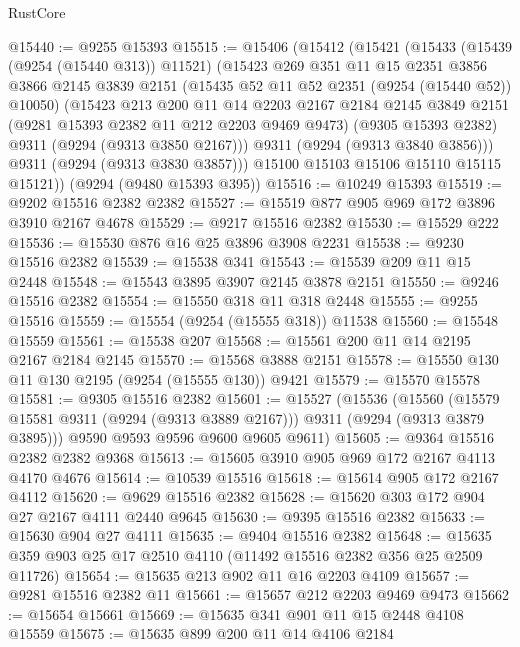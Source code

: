 \begin{lexlean}{RustCore}
\begin{coremodule}
@15440 := @9255 @15393
@15515 := @15406
    (@15412
      (@15421
        (@15433
          (@15439 (@9254 (@15440 @313)) @11521)
          (@15423
            @269
            @351
            @11
            @15
            @2351
            @3856
            @3866
            @2145
            @3839
            @2151
            (@15435 @52 @11 @52 @2351 (@9254 (@15440 @52)) @10050)
            (@15423
              @213
              @200
              @11
              @14
              @2203
              @2167
              @2184
              @2145
              @3849
              @2151
              (@9281 @15393 @2382 @11 @212 @2203 @9469 @9473)
              (@9305 @15393 @2382)
              @9311
              (@9294 (@9313 @3850 @2167)))
            @9311
            (@9294 (@9313 @3840 @3856)))
          @9311
          (@9294 (@9313 @3830 @3857)))
        @15100
        @15103
        @15106
        @15110
        @15115
        @15121))
    (@9294 (@9480 @15393 @395))
@15516 := @10249 @15393
@15519 := @9202 @15516 @2382 @2382
@15527 := @15519 @877 @905 @969 @172 @3896 @3910 @2167 @4678
@15529 := @9217 @15516 @2382
@15530 := @15529 @222
@15536 := @15530 @876 @16 @25 @3896 @3908 @2231
@15538 := @9230 @15516 @2382
@15539 := @15538 @341
@15543 := @15539 @209 @11 @15 @2448
@15548 := @15543 @3895 @3907 @2145 @3878 @2151
@15550 := @9246 @15516 @2382
@15554 := @15550 @318 @11 @318 @2448
@15555 := @9255 @15516
@15559 := @15554 (@9254 (@15555 @318)) @11538
@15560 := @15548 @15559
@15561 := @15538 @207
@15568 := @15561 @200 @11 @14 @2195 @2167 @2184 @2145
@15570 := @15568 @3888 @2151
@15578 := @15550 @130 @11 @130 @2195 (@9254 (@15555 @130)) @9421
@15579 := @15570 @15578
@15581 := @9305 @15516 @2382
@15601 := @15527
    (@15536
      (@15560 (@15579 @15581 @9311 (@9294 (@9313 @3889 @2167))) @9311 (@9294 (@9313 @3879 @3895)))
      @9590
      @9593
      @9596
      @9600
      @9605
      @9611)
@15605 := @9364 @15516 @2382 @2382 @9368
@15613 := @15605 @3910 @905 @969 @172 @2167 @4113 @4170 @4676
@15614 := @10539 @15516
@15618 := @15614 @905 @172 @2167 @4112
@15620 := @9629 @15516 @2382
@15628 := @15620 @303 @172 @904 @27 @2167 @4111 @2440 @9645
@15630 := @9395 @15516 @2382
@15633 := @15630 @904 @27 @4111
@15635 := @9404 @15516 @2382
@15648 := @15635 @359 @903 @25 @17 @2510 @4110 (@11492 @15516 @2382 @356 @25 @2509 @11726)
@15654 := @15635 @213 @902 @11 @16 @2203 @4109
@15657 := @9281 @15516 @2382 @11
@15661 := @15657 @212 @2203 @9469 @9473
@15662 := @15654 @15661
@15669 := @15635 @341 @901 @11 @15 @2448 @4108 @15559
@15675 := @15635 @899 @200 @11 @14 @4106 @2184

\end{coremodule}
\end{lexlean}
